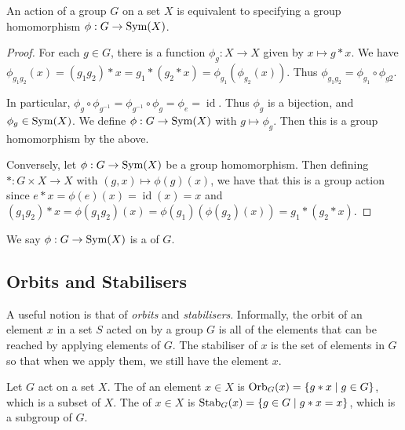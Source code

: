 \documentclass[a4paper]{scrartcl}
\begin{document}
\begin{proposition}
	An action of a group $G$ on a set $X$ is equivalent to specifying a group homomorphism $\phi: G \rightarrow \operatorname{Sym}(X)$.
\end{proposition}
\begin{proof}
	For each $g \in G$, there is a function $\phi_g : X \rightarrow X$ given by $x \mapsto g * x$. We have $\phi_{g_1 g_2}(x) = (g_1 g_2) * x = g_1 * (g_2 * x) = \phi_{g_1} (\phi_{g_2}(x))$. Thus $\phi_{g_1 g_2} = \phi_{g_1} \circ \phi_{g2}$.
	
	In particular, $\phi_g \circ \phi_{g^{-1}} = \phi_{g^{-1}} \circ \phi_g = \phi_e = \operatorname{id}$. Thus $\phi_g$ is a bijection, and $\phi_g \in \operatorname{Sym}(X)$. We define $\phi : G \rightarrow \operatorname{Sym}(X)$ with $g \mapsto \phi_g$. Then this is a group homomorphism by the above.
	
	Conversely, let $\phi : G \rightarrow \operatorname{Sym}(X)$ be a group homomorphism. Then defining $*: G \times X \rightarrow X$ with $(g, x) \mapsto \phi(g)(x)$, we have that this is a group action since $e * x = \phi(e)(x) = \operatorname{id}(x) = x$ and $(g_1 g_2) * x = \phi(g_1 g_2)(x) = \phi(g_1)(\phi(g_2)(x)) = g_1 * (g_2 * x)$.
\end{proof}

\begin{definition}
	We say $\phi: G \rightarrow \operatorname{Sym}(X)$ is a  of $G$.
\end{definition}

\subsection{Orbits and Stabilisers}

A useful notion is that of \emph{orbits} and \emph{stabilisers}. Informally, the orbit of an element $x$ in a set $S$ acted on by a group $G$ is all of the elements that can be reached by applying elements of $G$. The stabiliser of $x$ is the set of elements in $G$ so that when we apply them, we still have the element $x$.

\begin{definition}
	Let $G$ act on a set $X$. The  of an element $x \in X$ is $\operatorname{Orb}_G(x) = \{ g * x \mid g \in G \}$, which is a subset of $X$. The  of $x \in X$ is $\operatorname{Stab}_G(x) = \{ g \in G \mid g * x = x \}$, which is a subgroup of $G$.
\end{definition}
\end{document}
